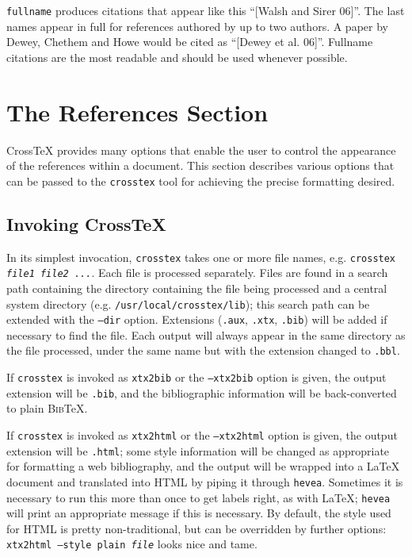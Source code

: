 \documentclass{article}
\newcommand{\XTX}{Cross\TeX}
\newcommand{\BibTeX}{\textsc{Bib}\TeX}
\begin{document}
\texttt{fullname} produces citations that appear like this ``[Walsh and
Sirer 06]''. The last names appear in full for references authored by
up to two authors. A paper by Dewey, Chethem and Howe would be cited as
``[Dewey et al. 06]''.  Fullname citations are the most readable and
should be used whenever possible.

\section{The References Section\label{sec:references}}

\XTX{} provides many options that enable the user to control the
appearance of the references within a document. This section describes
various options that can be passed to the \texttt{crosstex} tool for
achieving the precise formatting desired.

\subsection{Invoking \XTX{}}

In its simplest invocation, \texttt{crosstex} takes one or more file
names, e.g. \texttt{crosstex \textrm{\textit{file1 file2 ...}}}. Each
file is processed separately. Files are found in a search path containing
the directory containing the file being processed and a central system
directory (e.g. \texttt{/usr/local/crosstex/lib}); this search path can
be extended with the \texttt{--dir} option. Extensions (\texttt{.aux},
\texttt{.xtx}, \texttt{.bib}) will be added if necessary to find the
file. Each output will always appear in the same directory as the
file processed, under the same name but with the extension changed to
\texttt{.bbl}.

If \texttt{crosstex} is invoked as \texttt{xtx2bib} or the
\texttt{--xtx2bib} option is given, the output extension will be
\texttt{.bib}, and the bibliographic information will be back-converted
to plain \BibTeX{}.

If \texttt{crosstex} is invoked as \texttt{xtx2html} or the
\texttt{--xtx2html} option is given, the output extension will be
\texttt{.html}; some style information will be changed as appropriate
for formatting a web bibliography, and the output will be wrapped
into a \LaTeX{} document and translated into HTML by piping it through
\texttt{hevea}. Sometimes it is necessary to run this more than once
to get labels right, as with \LaTeX{}; \texttt{hevea} will print an
appropriate message if this is necessary. By default, the style used
for HTML is pretty non-traditional, but can be overridden by further
options: \texttt{xtx2html --style plain \textrm{\textit{file}}} looks
nice and tame.
\end{document}
